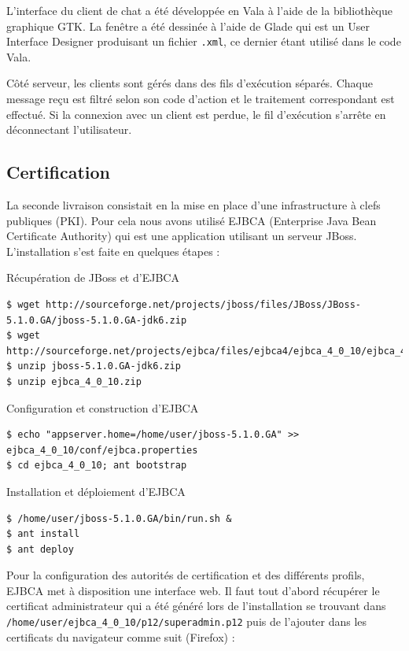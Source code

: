 \documentclass[a4paper,11pt,french]{book}
\begin{document}
L'interface du client de chat a été développée en Vala à l'aide de la bibliothèque graphique GTK. La fenêtre a été dessinée à l'aide de Glade qui est un User Interface Designer produisant un fichier \verb+.xml+, ce dernier étant utilisé dans le code Vala.

Côté serveur, les clients sont gérés dans des fils d'exécution séparés. Chaque message reçu est filtré selon son code d'action et le traitement correspondant est effectué. Si la connexion avec un client est perdue, le fil d'exécution s'arrête en déconnectant l'utilisateur.

\subsection{Certification}
La seconde livraison consistait en la mise en place d'une infrastructure à clefs publiques (PKI). Pour cela nous avons utilisé EJBCA (Enterprise Java Bean Certificate Authority) qui est une application utilisant un serveur JBoss. L'installation s'est faite en quelques étapes :

\begin{paragraph}{Récupération de JBoss et d'EJBCA}
\small{
\begin{verbatim}
$ wget http://sourceforge.net/projects/jboss/files/JBoss/JBoss-5.1.0.GA/jboss-5.1.0.GA-jdk6.zip
$ wget http://sourceforge.net/projects/ejbca/files/ejbca4/ejbca_4_0_10/ejbca_4_0_10.zip
$ unzip jboss-5.1.0.GA-jdk6.zip
$ unzip ejbca_4_0_10.zip
\end{verbatim}
}
\end{paragraph}

\begin{paragraph}{Configuration et construction d'EJBCA}
\small{
\begin{verbatim}
$ echo "appserver.home=/home/user/jboss-5.1.0.GA" >> ejbca_4_0_10/conf/ejbca.properties
$ cd ejbca_4_0_10; ant bootstrap 
\end{verbatim}
}
\end{paragraph}

\begin{paragraph}{Installation et déploiement d'EJBCA}
\small{
\begin{verbatim}
$ /home/user/jboss-5.1.0.GA/bin/run.sh &
$ ant install
$ ant deploy
\end{verbatim}
}
\end{paragraph}
\newpage

Pour la configuration des autorités de certification et des différents profils, EJBCA met à disposition une interface web. Il faut tout d'abord récupérer le certificat administrateur qui a été généré lors de l'installation se trouvant dans \verb+/home/user/ejbca_4_0_10/p12/superadmin.p12+ puis de l'ajouter dans les certificats du navigateur comme suit (Firefox) :
\end{document}
